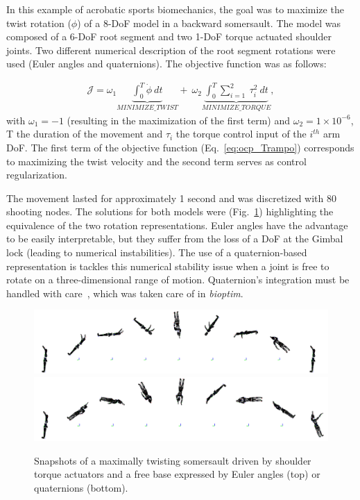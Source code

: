 In this example of acrobatic sports biomechanics, the goal was to maximize the twist rotation ($\phi$) of a 8-DoF model in a backward somersault.
The model was composed of a 6-DoF root segment and two 1-DoF torque actuated shoulder joints.
Two different numerical description of the root segment rotations were used (Euler angles and quaternions).
The objective function was as follows:

\begin{eqnarray}\label{eq:ocp_Trampo}
\mathcal{J} = \omega_1 \underbrace{\int_0^T \dot{\phi}~dt}_{MINIMIZE\_TWIST}  +~\omega_2 \underbrace{\int_0^T \sum_{i=1}^{2}~\tau_{i}^2~dt}_{MINIMIZE\_ TORQUE},
\end{eqnarray}
with $\omega_1 = -1$ (resulting in the maximization of the first term) and $\omega_2 = 1\times 10^{-6}$, T the duration of the movement and $\tau_{i}$ the torque control input of the $i^{th}$ arm DoF.
The first term of the objective function (Eq.~\ref{eq:ocp_Trampo}) corresponds to maximizing the twist velocity and the second term serves as control regularization.


The movement lasted for approximately 1 second and was discretized with 80 shooting nodes.
The solutions for both models were  (Fig.~\ref{fig:snapshots_quaternion_base_twisting_somersault}) highlighting the equivalence of the two rotation representations.
Euler angles have the advantage to be easily interpretable, but they suffer from the loss of a DoF at the Gimbal lock (leading to numerical instabilities).
The use of a quaternion-based representation is tackles this numerical stability issue when a joint is free to rotate on a three-dimensional range of motion.
Quaternion's integration must be handled with care~\cite{bailly2020optimal}, which was taken care of in \textit{bioptim}.


\begin{figure}[t!]
\centering
\includegraphics[width=\textwidth]{figures/Euler_Bioptim_MaxVrille_dos.png}\\
\vspace*{0.5em}
\includegraphics[width=\textwidth]{figures/Quat_Bioptim_MaxVrille_dos.png}
\caption{Snapshots of a maximally twisting somersault driven by shoulder torque actuators and a free base expressed by Euler angles (top) or quaternions (bottom).}
\label{fig:snapshots_quaternion_base_twisting_somersault}
\end{figure}


